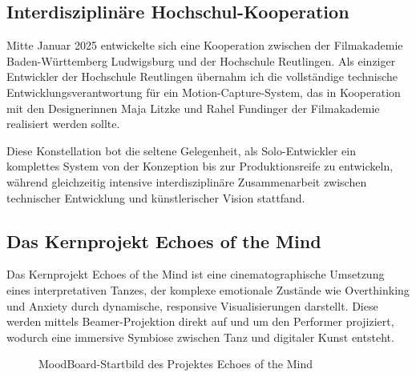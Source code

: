 
\subsection{Interdisziplinäre Hochschul-Kooperation}

Mitte Januar 2025 entwickelte sich eine Kooperation zwischen der Filmakademie Baden-Württemberg Ludwigsburg und der Hochschule Reutlingen. Als einziger Entwickler der Hochschule Reutlingen übernahm ich die vollständige technische Entwicklungsverantwortung für ein Motion-Capture-System, das in Kooperation mit den Designerinnen Maja Litzke und Rahel Fundinger der Filmakademie realisiert werden sollte.

Diese Konstellation bot die seltene Gelegenheit, als Solo-Entwickler ein komplettes System von der Konzeption bis zur Produktionsreife zu entwickeln, während gleichzeitig intensive interdisziplinäre Zusammenarbeit zwischen technischer Entwicklung und künstlerischer Vision stattfand.

\subsection{Das Kernprojekt Echoes of the Mind}

Das Kernprojekt Echoes of the Mind ist eine cinematographische Umsetzung eines interpretativen Tanzes, der komplexe emotionale Zustände wie Overthinking und Anxiety durch dynamische, responsive Visualisierungen darstellt. Diese werden mittels Beamer-Projektion direkt auf und um den Performer projiziert, wodurch eine immersive Symbiose zwischen Tanz und digitaler Kunst entsteht.

\begin{figure}[htbp]
    \centering
    \caption{MoodBoard-Startbild des Projektes \glqq Echoes of the Mind\grqq{}}
    \label{fig:echoes_startbild}
\end{figure}



